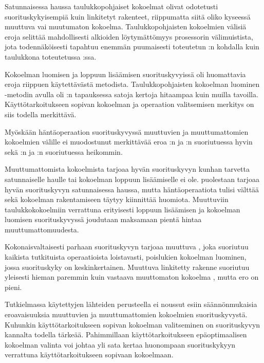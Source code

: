 Satunnaisessa haussa taulukkopohjaiset kokoelmat olivat odotetusti suorituskykyisempiä kuin linkitetyt rakenteet, riippumatta siitä oliko kyseessä muuttuva vai muutumaton kokoelma. Taulukkopohjaisten kokoelmien välisiä eroja selittää mahdollisesti alkioiden löytymättömyys prosessorin välimuistista, jota todennäköisesti tapahtuu enemmän puumaisesti toteutetun :n kohdalla kuin taulukkona toteutetussa :ssa.

Kokoelman luomisen ja loppuun lisäämisen suorituskyvyissä oli huomattavia eroja riippuen käytettävästä metodista. Taulukkopohjaisten  kokoelman luominen \code{:+}-metodin avulla oli :n tapauksessa satoja kertoja hitaampaa kuin muilla tavoilla. Käyttötarkoitukseen sopivan kokoelman ja operaation valitsemisen merkitys on siis todella merkittävä.

Myöskään häntäoperaation suorituskyvyssä muuttuvien ja muuttumattomien kokoelmien välille ei muodostunut merkittävää eroa :n ja :n suoriutuessa hyvin sekä :n ja :n suoriutuessa heikommin. 

Muuttumattomista kokoelmista  tarjoaa hyvän suorituskyvyn kunhan tarvetta satunnaiselle haulle tai kokoelman loppuun lisäämiselle ei ole.  puolestaan tarjoaa hyvän suorituskyvyn satunnaisessa haussa, mutta häntäoperaatiota tulisi välttää sekä kokoelman rakentamiseen täytyy kiinnittää huomiota. Muuttuviin taulukkokokoelmiin verrattuna erityisesti loppuun lisäämisen ja kokoelman luomisen suorituskyvyssä joudutaan maksamaan pientä hintaa muuttumattomuudesta.

Kokonaisvaltaisesti parhaan suorituskyvyn tarjoaa muuttuva , joka suoriutuu kaikista tutkituista operaatioista loistavasti, poislukien kokoelman luominen, jossa suorituskyky on keskinkertainen. Muuttuva linkitetty rakenne  suoriutuu yleisesti hieman paremmin kuin vastaava muuttomaton kokoelma , mutta ero on pieni.

Tutkielmassa käytettyjen lähteiden perusteella ei noussut esiin säännönmukaisia eroavaisuuksia muuttuvien ja muuttumattomien kokoelmien suorituskyvystä. Kuhunkin käyttötarkoitukseen sopivan kokoelman valitseminen on suorituskyvyn kannalta todella tärkeää. Pahimmillaan käyttötarkoitukseen epäoptimaalisen kokoelman valinta voi johtaa yli sata kertaa huonompaan suorituskykyyn verrattuna käyttötarkoitukseen sopivaan kokoelmaan.
